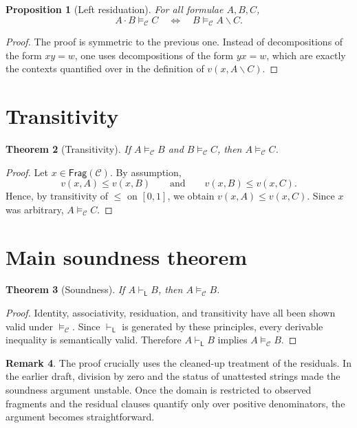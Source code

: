 \documentclass[12pt,a4paper]{report}
\newtheorem{theorem}{Theorem}[chapter]
\newtheorem{proposition}[theorem]{Proposition}
\theoremstyle{definition}
\newtheorem{remark}[theorem]{Remark}
\newcommand{\LC}{\mathsf{L}}
\newcommand{\Frag}{\mathsf{Frag}}
\newcommand{\Sem}{\models_{\mathcal C}}
\newcommand{\concat}{\mathbin{\cdot}}
\begin{document}
\begin{proposition}[Left residuation]
For all formulae $A,B,C$,
\[
A\concat B \Sem C
\quad\Longleftrightarrow\quad
B \Sem A\backslash C.
\]
\end{proposition}

\begin{proof}
The proof is symmetric to the previous one. Instead of decompositions of the form $xy=w$, one
uses decompositions of the form $yx=w$, which are exactly the contexts quantified over in the
definition of $v(x,A\backslash C)$.
\end{proof}

\section{Transitivity}
\begin{theorem}[Transitivity]
If $A \Sem B$ and $B \Sem C$, then $A \Sem C$.
\end{theorem}

\begin{proof}
Let $x \in \Frag(\mathcal C)$. By assumption,
\[
v(x,A) \leq v(x,B)
\qquad\text{and}\qquad
v(x,B) \leq v(x,C).
\]
Hence, by transitivity of $\leq$ on $[0,1]$, we obtain $v(x,A) \leq v(x,C)$. Since $x$ was
arbitrary, $A \Sem C$.
\end{proof}

\section{Main soundness theorem}
\begin{theorem}[Soundness]
If $A \vdash_{\LC} B$, then $A \Sem B$.
\end{theorem}

\begin{proof}
Identity, associativity, residuation, and transitivity have all been shown valid under $\Sem$.
Since $\vdash_{\LC}$ is generated by these principles, every derivable inequality is semantically
valid. Therefore $A \vdash_{\LC} B$ implies $A \Sem B$.
\end{proof}

\begin{remark}
The proof crucially uses the cleaned-up treatment of the residuals. In the earlier draft, division
by zero and the status of unattested strings made the soundness argument unstable. Once the
domain is restricted to observed fragments and the residual clauses quantify only over positive
denominators, the argument becomes straightforward.
\end{remark}
\end{document}

